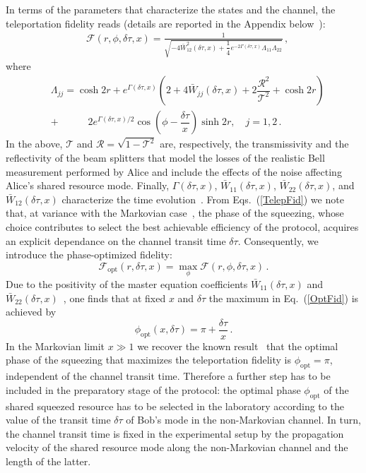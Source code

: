 \documentclass[prl,twocolumn,aps,floatfix,showpacs,tightenlines,superscriptaddress,amsmath,amssymb,amsfonts,10pt]{revtex4-1}
\begin{document}
In terms of the parameters that characterize the states and the channel, the teleportation fidelity reads (details are reported in the Appendix below~\cite{SuppMat}):
\begin{align}\label{TelepFid}
&\mathcal{F}(r,\phi,\delta\tau,x) = \frac{1}{\sqrt{ -4\bar{W}_{12}^2(\delta\tau,x)+\dfrac{1}{4} e^{-2\Gamma(\delta\tau,x)} \Lambda_{11} \Lambda_{22}
	}} \, ,
\end{align}
where
\begin{align}
	&\Lambda_{jj}\!=\!\cosh 2r +e^{\Gamma(\delta\tau,x)}\!\!\left(\!\!2\!+\!4\bar{W}_{jj}(\delta\tau,x)\!+2\dfrac{\mathcal{R}^2}{\mathcal{T}^2}\!+\!\cosh 2r\!\!\right)
	\nonumber\\
	& + \qquad\quad 2e^{\Gamma(\delta\tau,x)/2}\cos\left(\phi-\dfrac{\delta\tau}{x}\right)\sinh 2r , \quad j=1,2 \, .
	\label{cofficients}
	\end{align}
In the above,
$\mathcal{T}$ and $\mathcal{R}=\sqrt{1-\mathcal{T}^2}$ are, respectively, the transmissivity and the reflectivity of the beam splitters that model the losses of the realistic Bell measurement performed by Alice and include the effects of the noise affecting Alice's shared resource mode. Finally, $\Gamma(\delta\tau,x)$, $\bar{W}_{11}(\delta\tau,x)$, $\bar{W}_{22}(\delta\tau,x)$, and $\bar{W}_{12}(\delta\tau,x)$ characterize the time evolution~\cite{SuppMat}.
From Eqs.~(\ref{TelepFid}) we note that, at variance with the Markovian case~\cite{PhysRevA.81.012333}, the phase of the squeezing, whose choice contributes
to select the best achievable efficiency of the protocol, acquires an explicit dependance on the channel transit time $\delta\tau$.
Consequently, we introduce the phase-optimized fidelity:
\begin{equation}\label{OptFid}
\mathcal{F}_{\textrm{opt}}(r, \delta\tau, x)=\max_{\phi}\mathcal{F}(r,\phi, \delta\tau, x) \, .
\end{equation}
Due to the positivity of the  master equation coefficients $\bar{W}_{11}(\delta\tau, x)$ and $\bar{W}_{22}(\delta\tau, x)$~\cite{PhysRevA.80.062324},
one finds that at fixed $x$ and $\delta\tau$ the maximum in Eq.~(\ref{OptFid}) is achieved by
\begin{equation}\label{OptPhi}
\phi_{\textrm{opt}}(x,\delta\tau)=\pi+\dfrac{\delta\tau}{x} \, .
\end{equation}
In the Markovian limit $x\gg 1$ we recover the known result~\cite{PhysRevLett.95.150503} that the optimal phase of the squeezing that maximizes the teleportation fidelity is $\phi_{\textrm{opt}} = \pi$, independent of the channel transit time. Therefore a further step has to be included in the preparatory stage of the protocol: the optimal phase $\phi_{\textrm{opt}}$ of the shared squeezed resource has to be selected in the laboratory according to the value of the transit time $\delta \tau$ of Bob's mode in the non-Markovian channel. In turn, the channel transit time is fixed in the experimental setup by the propagation velocity of the shared resource mode along the non-Markovian channel and the length of the latter.
\end{document}
